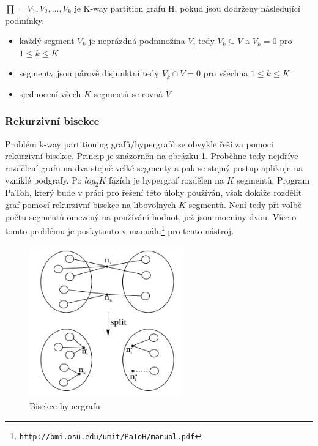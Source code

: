\documentclass[thesis=M,czech]{FITthesis}[2012/06/26]
\begin{document}
\medskip
$\prod = {V_1, V_2, ..., V_k} $ je K-way partition grafu H, pokud jsou dodrženy následující podmínky.
\begin{itemize}
\item každý segment $V_k$ je neprázdná podmnožina $V$, tedy $V_k \subseteq V$ a $V_k = 0$ pro $1 \leq k \leq K$
\item segmenty jsou párově disjunktní tedy $V_k \cap V = 0 $ pro všechna $1 \leq k \leq K$
\item sjednocení všech $K$ segmentů se rovná $V$
\end{itemize}

\subsubsection{Rekurzivní bisekce}
Problém k-way partitioning grafů/hypergrafů se obvykle řeší za pomoci rekurzivní bisekce. Princip je znázorněn na obrázku \ref{figbisection}. Proběhne tedy nejdříve rozdělení grafu na dva stejně velké segmenty a pak se stejný postup aplikuje na vzniklé podgrafy. Po $log_2K$ fázích je hypergraf rozdělen na $K$ segmentů. Program PaToh, který bude v práci pro řešení této úlohy používán, však dokáže rozdělit graf pomocí rekurzivní bisekce na libovolných $K$ segmentů. Není tedy při volbě počtu segmentů omezený na používání hodnot, jež jsou mocniny dvou. Více o tomto problému je poskytnuto v manuálu\footnote{\texttt{http://bmi.osu.edu/umit/PaToH/manual.pdf}} pro tento nástroj. 




\begin{figure}[h]\centering
	\includegraphics[width=0.6\textwidth, angle=0]{files/bisection.png}
	\caption[Bisekce hypergrafu]{Bisekce hypergrafu}\label{figbisection}
\end{figure}
\end{document}
